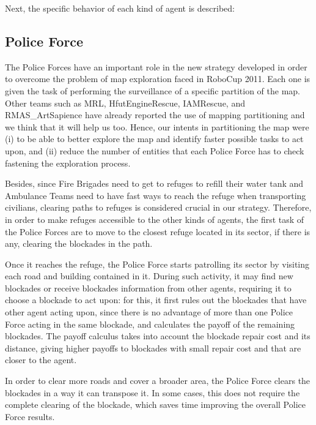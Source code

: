 \documentclass{llncs}
\begin{document}
Next, the specific behavior of each kind of agent is described:
\subsection{Police Force}
\label{subsec:policeForce}
The Police Forces have an important role in the new strategy developed in order to overcome the problem of map exploration faced in RoboCup 2011. Each one is given the task of performing the surveillance of a specific partition of the map. Other teams such as MRL, HfutEngineRescue, IAMRescue, and RMAS\_ArtSapience have already reported the use of mapping partitioning and we think that it will help us too. Hence, our intents in partitioning the map were (i) to be able to better explore the map and identify faster possible tasks to act upon, and (ii) reduce the number of entities that each Police Force has to check fastening the exploration process.

Besides, since Fire Brigades need to get to refuges to refill their water tank and Ambulance Teams need to have fast ways to reach the refuge when transporting civilians, clearing paths to refuges is considered crucial in our strategy. Therefore, in order to make refuges accessible to the other kinds of agents, the first task of the Police Forces are to move to the closest refuge located in its sector, if there is any, clearing the blockades in the path.

Once it reaches the refuge, the Police Force starts patrolling its sector by visiting each road and building contained in it. During such activity, it may find new blockades or receive blockades information from other agents, requiring it to choose a blockade to act upon: for this, it first rules out the blockades that have other agent acting upon, since there is no advantage of more than one Police Force acting in the same blockade, and calculates the payoff of the remaining blockades. The payoff calculus takes into account the blockade repair cost and its distance, giving higher payoffs to blockades with small repair cost and that are closer to the agent.

In order to clear more roads and cover a broader area, the Police Force clears the blockades in a way it can transpose it. In some cases, this does not require the complete clearing of the blockade, which saves time improving the overall Police Force results.
\end{document}
